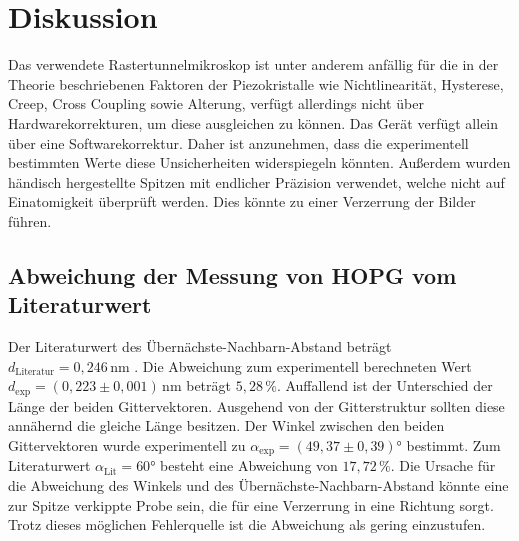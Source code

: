 \section{Diskussion}
\label{sec:Diskussion}
Das verwendete Rastertunnelmikroskop ist unter anderem anfällig für die in der Theorie beschriebenen Faktoren der Piezokristalle wie Nichtlinearität, Hysterese, Creep, Cross Coupling sowie Alterung, verfügt allerdings nicht über Hardwarekorrekturen, um diese ausgleichen zu können. Das Gerät verfügt allein über eine Softwarekorrektur. Daher ist anzunehmen, dass die experimentell bestimmten Werte diese Unsicherheiten widerspiegeln könnten. 
Außerdem wurden händisch hergestellte Spitzen mit endlicher Präzision verwendet, welche nicht auf Einatomigkeit überprüft werden. Dies könnte zu einer Verzerrung der Bilder führen.


\subsection{Abweichung der Messung von HOPG vom Literaturwert}
Der Literaturwert des Übernächste-Nachbarn-Abstand beträgt $d_{\text{Literatur}} = 0,246 \, \unit{\nano\meter}$ \cite{ScanningTunnelingMicroscopy}. Die Abweichung zum experimentell berechneten Wert $d_{\text{exp}} = (0,223 \pm 0,001)  \, \unit{\nano\meter}$ beträgt $5,28 \, \%$. Auffallend ist der Unterschied der Länge der beiden Gittervektoren. Ausgehend von der Gitterstruktur sollten diese annähernd die gleiche Länge besitzen. Der Winkel zwischen den beiden Gittervektoren wurde experimentell zu $\alpha_{\text{exp}} = (49,37 \pm 0,39)°$ bestimmt. Zum Literaturwert $\alpha_{\text{Lit}} = 60°$ besteht eine Abweichung von $17,72 \, \%$. Die Ursache für die Abweichung des Winkels und des Übernächste-Nachbarn-Abstand könnte eine zur Spitze verkippte Probe sein, die für eine Verzerrung in eine Richtung sorgt. Trotz dieses möglichen Fehlerquelle ist die Abweichung als gering einzustufen. 


